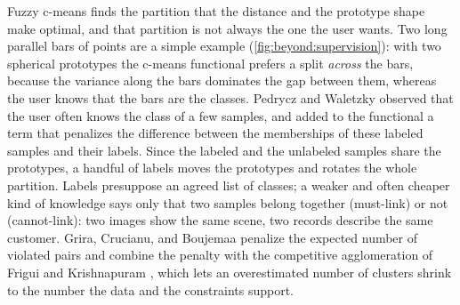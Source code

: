 Fuzzy c-means finds the partition that the distance and the prototype shape make optimal, and that partition is not always the one the user wants. Two long parallel bars of points are a simple example (\cref{fig:beyond:supervision}): with two spherical prototypes the c-means functional prefers a split \emph{across} the bars, because the variance along the bars dominates the gap between them, whereas the user knows that the bars are the classes. Pedrycz and Waletzky \cite{pedrycz:1997:ssfcm} observed that the user often knows the class of a few samples, and added to the functional a term that penalizes the difference between the memberships of these labeled samples and their labels. Since the labeled and the unlabeled samples share the prototypes, a handful of labels moves the prototypes and rotates the whole partition. Labels presuppose an agreed list of classes; a weaker and often cheaper kind of knowledge says only that two samples belong together (must-link) or not (cannot-link): two images show the same scene, two records describe the same customer. Grira, Crucianu, and Boujemaa \cite{grira:2006:pcca} penalize the expected number of violated pairs and combine the penalty with the competitive agglomeration of Frigui and Krishnapuram \cite{frigui:1997:ca}, which lets an overestimated number of clusters shrink to the number the data and the constraints support.

